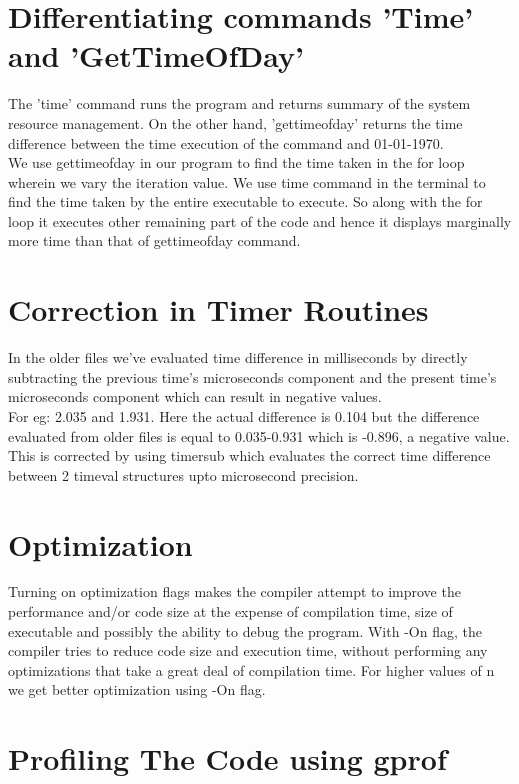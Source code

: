 \documentclass[11pt]{article}
\begin{document}
\section{Differentiating commands 'Time' and 'GetTimeOfDay'}
The 'time' command runs the program and returns summary of the system resource management. On the other hand, 'gettimeofday' returns the time difference between the time execution of the command and 01-01-1970.
\\
We use gettimeofday in our program to find the time taken in the for loop wherein we vary the iteration value. We use time command in the terminal to find the time taken by the entire executable to execute. So along with the for loop it executes other remaining part of the code and hence it displays marginally more time than that of gettimeofday command.
\section{Correction in Timer Routines}
In the older files we've evaluated time difference in milliseconds by directly subtracting the previous time's microseconds component and the present time's microseconds component which can result in negative values.
\\
For eg: 2.035 and 1.931. Here the actual difference is 0.104 but the difference evaluated from older files is equal to 0.035-0.931 which is -0.896, a negative value.
\\
This is corrected by using timersub which evaluates the correct time difference between 2 timeval structures upto microsecond precision. 
\section{Optimization}
Turning on optimization flags makes the compiler attempt to improve the performance and/or code size at the expense of compilation time, size of executable and possibly the ability to debug the program. With -On flag, the compiler tries to reduce code size and execution time, without performing any optimizations that take a great deal of compilation time. For higher values of n we get better optimization using -On flag.
\section{Profiling The Code using gprof} 
\end{document}
